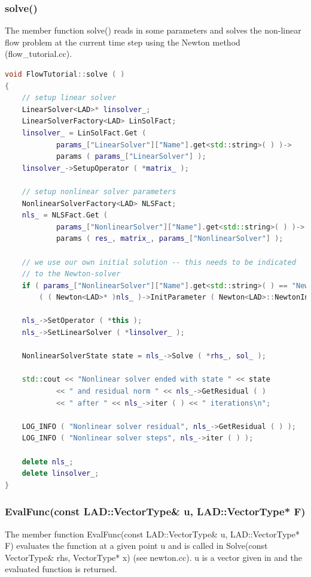 \documentclass[a4paper, 11pt, twoside]{article}
\begin{document}
\subsubsection{solve()}
The member function solve() reads in some parameters and solves the non-linear flow problem at the current time step using the Newton method (flow\_tutorial.cc).

\begin{lstlisting}[language=C++, basicstyle={\footnotesize, \ttfamily}, keywordstyle=\color{blue},  numbers=none, tabsize=4]
void FlowTutorial::solve ( )
{
    // setup linear solver
    LinearSolver<LAD>* linsolver_;
    LinearSolverFactory<LAD> LinSolFact;
    linsolver_ = LinSolFact.Get (
            params_["LinearSolver"]["Name"].get<std::string>( ) )->
            params ( params_["LinearSolver"] );
    linsolver_->SetupOperator ( *matrix_ );

    // setup nonlinear solver parameters
    NonlinearSolverFactory<LAD> NLSFact;
    nls_ = NLSFact.Get ( 
            params_["NonlinearSolver"]["Name"].get<std::string>( ) )->
            params ( res_, matrix_, params_["NonlinearSolver"] );

    // we use our own initial solution -- this needs to be indicated
    // to the Newton-solver
    if ( params_["NonlinearSolver"]["Name"].get<std::string>( ) == "Newton" )
        ( ( Newton<LAD>* )nls_ )->InitParameter ( Newton<LAD>::NewtonInitialSolutionOwn );

    nls_->SetOperator ( *this );
    nls_->SetLinearSolver ( *linsolver_ );

    NonlinearSolverState state = nls_->Solve ( *rhs_, sol_ );

    std::cout << "Nonlinear solver ended with state " << state
            << " and residual norm " << nls_->GetResidual ( )
            << " after " << nls_->iter ( ) << " iterations\n";

    LOG_INFO ( "Nonlinear solver residual", nls_->GetResidual ( ) );
    LOG_INFO ( "Nonlinear solver steps", nls_->iter ( ) );

    delete nls_;
    delete linsolver_;
}
\end{lstlisting}

\subsubsection{EvalFunc(const LAD::VectorType\& u, LAD::VectorType* F)}
The member function EvalFunc(const LAD::VectorType\& u, LAD::VectorType* F) evaluates the function at a given point u and is called in Solve(const VectorType\& rhs, VectorType* x) (see newton.cc). u is a vector given in and the evaluated function is returned.
\end{document}
